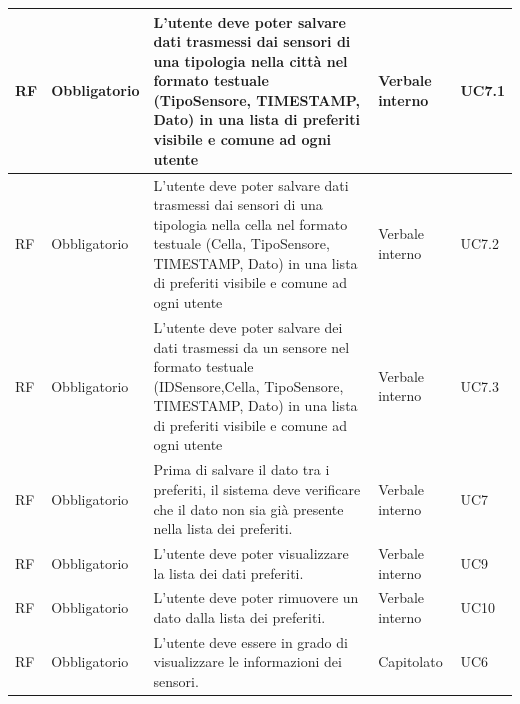 \documentclass{article}
\begin{document}
\begin{longtable}{|C{1cm}|C{2cm}|>{\raggedright}m{5cm}|C{1.5cm}|C{2cm}|}
    \hline
     RF & Obbligatorio        & L'utente deve poter salvare dati trasmessi dai sensori di una tipologia nella città nel formato testuale (TipoSensore, TIMESTAMP, Dato) in una lista di preferiti visibile e comune ad ogni utente                                & Verbale interno & UC7.1               \\
    \hline
     RF & Obbligatorio        & L'utente deve poter salvare dati trasmessi dai  sensori di una tipologia nella cella nel formato testuale (Cella, TipoSensore, TIMESTAMP, Dato) in una lista di preferiti visibile e comune ad ogni utente                         & Verbale interno & UC7.2               \\
    \hline
     RF & Obbligatorio        & L'utente deve poter salvare dei dati trasmessi da un sensore nel formato testuale (IDSensore,Cella, TipoSensore, TIMESTAMP, Dato) in una lista di preferiti visibile e comune ad ogni utente                                       & Verbale interno & UC7.3               \\
    \hline
     RF & Obbligatorio        & Prima di salvare il dato tra i preferiti, il sistema deve verificare che il dato non sia già presente nella lista dei preferiti.                                                                                                   & Verbale interno      & UC7               \\
    \hline
     RF & Obbligatorio        & L'utente deve poter visualizzare la lista dei dati preferiti.                                                                                                                                                                       & Verbale interno & UC9                 \\
    \hline
     RF & Obbligatorio        & L'utente deve poter rimuovere un dato dalla lista dei preferiti.                                                                                                                                                                    & Verbale interno & UC10               \\
    \hline
     RF & Obbligatorio        & L'utente deve essere in grado di visualizzare le informazioni dei sensori.                                                                                                                                                           & Capitolato      & UC6               \\

\end{longtable}
\end{document}
